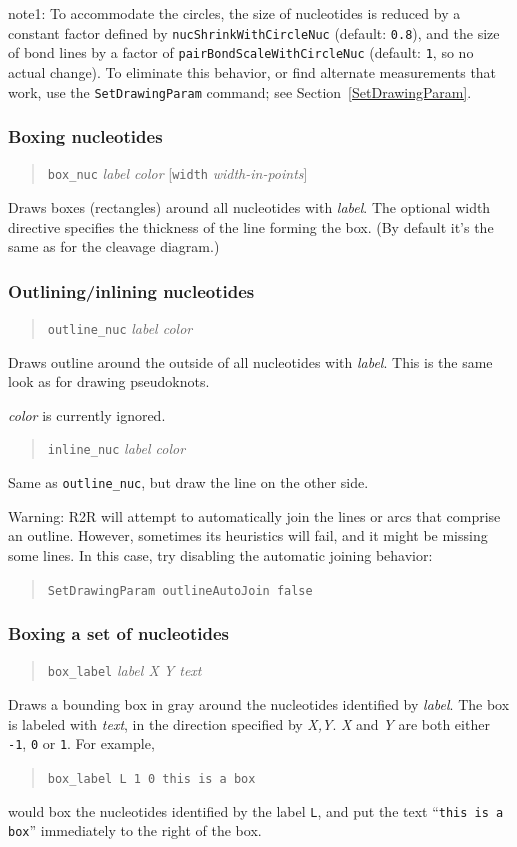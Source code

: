 \documentclass[letterpaper,12pt]{report}
\newcommand{\example}[1]{
\begin{quote}
{\raggedright
#1
}
\end{quote}
}
\newcommand{\examplett}[1]{
\example{{\tt #1}}
}
\begin{document}
note1: To accommodate the circles, the size of nucleotides is reduced by a constant factor defined by
{\tt nucShrinkWithCircleNuc} (default: {\tt 0.8}), 
and the size of bond lines by a factor of 
{\tt pairBondScaleWithCircleNuc} (default: {\tt 1}, so no actual change).
To eliminate this behavior, or find alternate measurements that work, use
the {\tt SetDrawingParam} command; see Section~\ref{SetDrawingParam}.

\subsubsection{Boxing nucleotides}
\example{{\tt box\_nuc}  \textit{label  color }[{\tt width}\textit{ width-in-points}]}

Draws boxes (rectangles) around all nucleotides with \textit{label}. The
optional width  directive specifies the thickness of the line forming
the box. (By default it{\textquoteright}s the same as for the cleavage
diagram.)

\subsubsection{Outlining/inlining nucleotides}
\example{{\tt outline\_nuc}  \textit{label  color}}

Draws outline around the outside of all nucleotides with \textit{label}.
This is the same look as for drawing pseudoknots.

\textit{color} is currently ignored.

\example{{\tt inline\_nuc}  \textit{label  color}}

Same as {\tt outline\_nuc}, but draw the line on the other side.

Warning: R2R will attempt to automatically join the lines or arcs that comprise an outline.  However, sometimes its heuristics will fail, and it might be missing some lines.  In this case, try disabling the automatic joining behavior:
\examplett{SetDrawingParam outlineAutoJoin false}

\subsubsection{Boxing a set of nucleotides}
\example{{\tt box\_label}  \textit{label  X  Y  text}}

Draws a bounding box in gray around the nucleotides identified by
\textit{label}.  The box is labeled with \textit{text}, in the
direction specified by \textit{X,Y}.  {\it X} and {\it Y} are both either {\tt -1}, {\tt 0} or {\tt 1}. For example,
\examplett{box\_label L 1 0 this is a box}
would box the nucleotides identified by the label {\tt L}, and put the text ``{\tt this is a box}'' immediately to the right of the box.
\end{document}
